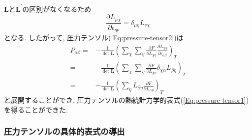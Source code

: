 $\bm{L}$と$\bm{L}^{\prime}$の区別がなくなるため
\begin{equation}
  \frac{\mathrm{\partial} L_{\mu\chi}}{\partial \epsilon_{\eta\nu}}
  =
  \delta_{\mu\eta} L_{\nu\chi}
\end{equation}
となる.
したがって, 圧力テンソル(\ref{Eq:pressure-tensor2})は
\begin{align}
  P_{\alpha \beta}
  =&
  - \frac{1}{\det \bm{L}}
  \left(
    \sum_{\chi} \sum_{\eta}
    \frac{\partial F}{\partial L_{\chi \eta}}
    \frac{\partial L_{\chi \eta}}{\partial \epsilon_{\alpha \beta}}
  \right)_{T}
  \\
  =&
  - \frac{1}{\det \bm{L}}
  \left(
    \sum_{\chi} \sum_{\eta}
    \frac{\partial F}{\partial L_{\chi \eta}}
    \delta_{\chi\alpha} L_{\beta\eta}
  \right)_{T}
  \\
  =&
  - \frac{1}{\det \bm{L}}
  \left(
    \sum_{\eta} L_{\beta\eta}
    \frac{\partial F}{\partial L_{\alpha \eta}}
  \right)_{T}
\end{align}
と展開することができ, 圧力テンソルの熱統計力学的表式(\ref{Eq:pressure-tensor1})を得ることができた. 

\subsubsection{圧力テンソルの具体的表式の導出}

